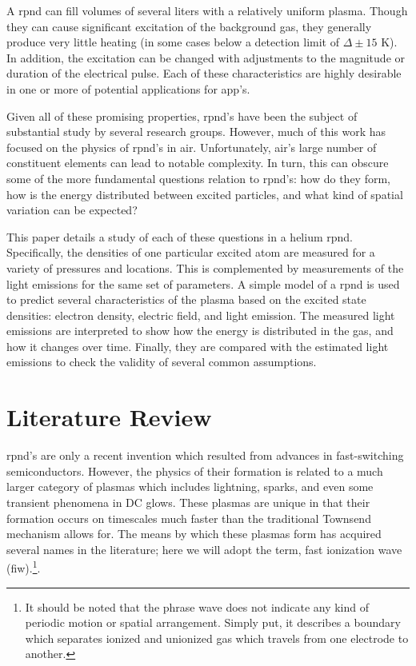 A \acs{rpnd} can fill volumes of several liters with a relatively uniform
plasma. Though they can cause significant excitation of the background gas, they
generally produce very little heating (in some cases below a detection limit of
$\Delta \pm 15$ K). In addition, the excitation can be changed with adjustments
to the magnitude or duration of the electrical pulse. Each of these
characteristics are highly desirable in one or more of potential applications
for \acs{app}'s.

Given all of these promising properties, \acs{rpnd}'s have been the subject of
substantial study by several research groups. However, much of this work has
focused on the physics of \acs{rpnd}'s in air. Unfortunately, air's large number
of constituent elements can lead to notable complexity. In turn, this can
obscure some of the more fundamental questions relation to \acs{rpnd}'s: how do
they form, how is the energy distributed between excited particles, and what
kind of spatial variation can be expected?

This paper details a study of each of these questions in a helium \acs{rpnd}.
Specifically, the densities of one particular excited atom are measured for a
variety of pressures and locations. This is complemented by measurements of the
light emissions for the same set of parameters. A simple model of a \acs{rpnd}
is used to predict several characteristics of the plasma based on the excited
state densities: electron density, electric field, and light emission. The
measured light emissions are interpreted to show how the energy is distributed
in the gas, and how it changes over time. Finally, they are compared with the
estimated light emissions to check the validity of several common assumptions.

\section{Literature Review}

\acs{rpnd}'s are only a recent invention which resulted from advances in
fast-switching semiconductors. However, the physics of their formation is
related to a much larger category of plasmas which includes lightning, sparks,
and even some transient phenomena in DC glows. These plasmas are unique in that
their formation occurs on timescales much faster than the traditional Townsend
mechanism allows for. The means by which these plasmas form has acquired several
names in the literature; here we will adopt the term, fast ionization wave
(\acs{fiw}).\footnote{It should be noted that the phrase wave does not indicate
any kind of periodic motion or spatial arrangement. Simply put, it describes a
boundary which separates ionized and unionized gas which travels from one
electrode to another.}.

